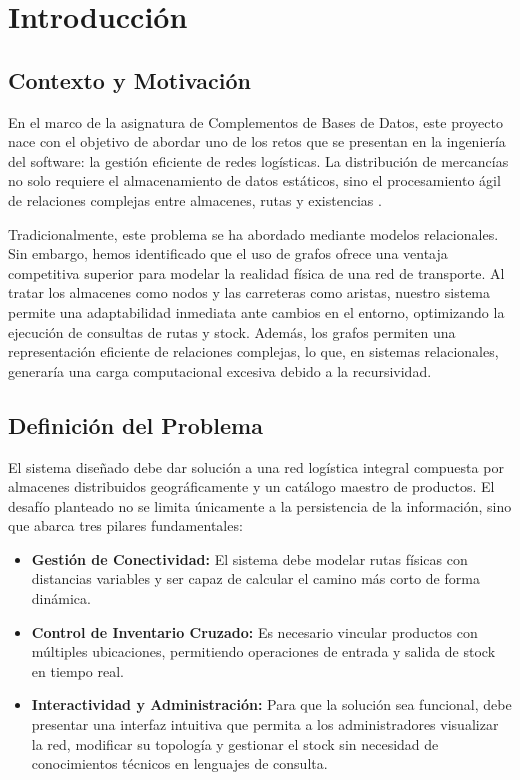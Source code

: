 \chapter{Introducción}\label{cap:introduccion}

\section{Contexto y Motivación}
En el marco de la asignatura de Complementos de Bases de Datos, este proyecto nace con el objetivo de abordar uno de los retos que se presentan en la ingeniería del software: la gestión eficiente de redes logísticas. La distribución de mercancías no solo requiere el almacenamiento de datos estáticos, sino el procesamiento ágil de relaciones complejas entre almacenes, rutas y existencias \cite{borrego2019}.

Tradicionalmente, este problema se ha abordado mediante modelos relacionales. Sin embargo, hemos identificado que el uso de grafos ofrece una ventaja competitiva superior para modelar la realidad física de una red de transporte. Al tratar los almacenes como nodos y las carreteras como aristas, nuestro sistema permite una adaptabilidad inmediata ante cambios en el entorno, optimizando la ejecución de consultas de rutas y stock. Además, los grafos permiten una representación eficiente de relaciones complejas, lo que, en sistemas relacionales, generaría una carga computacional excesiva debido a la recursividad.

\section{Definición del Problema}
El sistema diseñado debe dar solución a una red logística integral compuesta por almacenes distribuidos geográficamente y un catálogo maestro de productos. El desafío planteado no se limita únicamente a la persistencia de la información, sino que abarca tres pilares fundamentales:
\begin{itemize}
    \item \textbf{Gestión de Conectividad:} El sistema debe modelar rutas físicas con distancias variables y ser capaz de calcular el camino más corto de forma dinámica.
    \item \textbf{Control de Inventario Cruzado:} Es necesario vincular productos con múltiples ubicaciones, permitiendo operaciones de entrada y salida de stock en tiempo real.
    \item \textbf{Interactividad y Administración:} Para que la solución sea funcional, debe presentar una interfaz intuitiva que permita a los administradores visualizar la red, modificar su topología y gestionar el stock sin necesidad de conocimientos técnicos en lenguajes de consulta.
\end{itemize}

